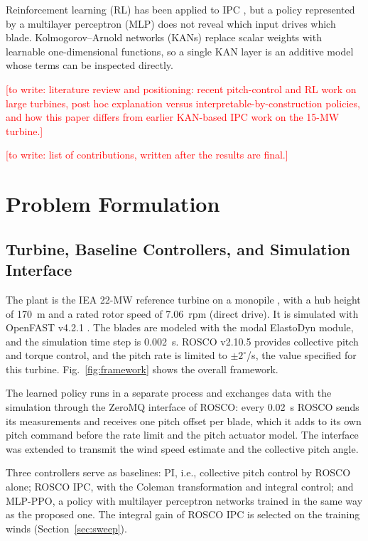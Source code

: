 \documentclass[journal]{IEEEtran}
\newcommand{\todo}[1]{\textcolor{red}{[to write: #1]}}
\begin{document}
Reinforcement learning (RL) has been applied to IPC \cite{coquelet2022rlipc}, but a policy
represented by a multilayer perceptron (MLP) does not reveal which input drives which blade.
Kolmogorov--Arnold networks (KANs) \cite{liu2025kan} replace scalar weights with learnable
one-dimensional functions, so a single KAN layer is an additive model whose terms can be inspected
directly.

\todo{literature review and positioning: recent pitch-control and RL work on large turbines,
post hoc explanation versus interpretable-by-construction policies, and how this paper differs
from earlier KAN-based IPC work on the 15-MW turbine.}

\todo{list of contributions, written after the results are final.}

\section{Problem Formulation}
\subsection{Turbine, Baseline Controllers, and Simulation Interface}
The plant is the IEA 22-MW reference turbine on a monopile \cite{zahle2024iea22}, with a hub
height of 170~m and a rated rotor speed of 7.06~rpm (direct drive). It is simulated with OpenFAST
v4.2.1 \cite{jonkman2013fast}. The blades are modeled with the modal ElastoDyn module, and the
simulation time step is 0.002~s. ROSCO v2.10.5 \cite{abbas2022rosco} provides collective pitch and
torque control, and the pitch rate is limited to $\pm 2^\circ$/s, the value specified for this
turbine. Fig.~\ref{fig:framework} shows the overall framework.

The learned policy runs in a separate process and exchanges data with the simulation through the
ZeroMQ interface of ROSCO: every 0.02~s ROSCO sends its measurements and receives one pitch offset
per blade, which it adds to its own pitch command before the rate limit and the pitch actuator
model. The interface was extended to transmit the wind speed estimate and the collective pitch
angle.

Three controllers serve as baselines: PI, i.e., collective pitch control by ROSCO alone; ROSCO
IPC, with the Coleman transformation and integral control; and MLP-PPO, a policy with multilayer
perceptron networks trained in the same way as the proposed one. The integral gain of ROSCO IPC is
selected on the training winds (Section~\ref{sec:sweep}).
\end{document}
